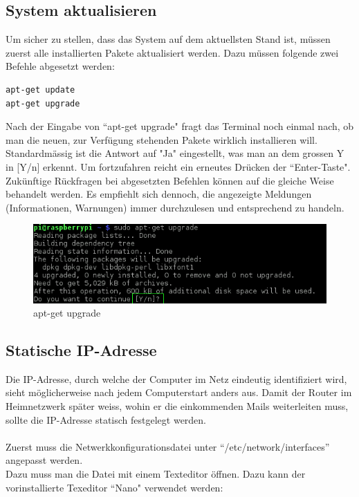 \subsection{System aktualisieren}
Um sicher zu stellen, dass das System auf dem aktuellsten Stand ist, müssen zuerst alle installierten Pakete aktualisiert werden. Dazu müssen folgende zwei Befehle abgesetzt werden:

\begin{lstlisting}
apt-get update
apt-get upgrade
\end{lstlisting}

Nach der Eingabe von ``apt-get upgrade" fragt das Terminal noch einmal nach, ob man die neuen, zur Verfügung stehenden Pakete wirklich installieren will. Standardmässig ist die Antwort auf "Ja" eingestellt, was man an dem grossen Y in [Y/n] erkennt. Um fortzufahren reicht ein erneutes Drücken der ``Enter-Taste". Zukünftige Rückfragen bei abgesetzten Befehlen können auf die gleiche Weise behandelt werden. Es empfiehlt sich dennoch, die angezeigte Meldungen (Informationen, Warnungen) immer durchzulesen und entsprechend zu handeln.

\begin{figure}[h]
\centering
\includegraphics[scale=0.7]{images/upgrade}
\caption{apt-get upgrade}
\end{figure}

\subsection{Statische IP-Adresse}
Die IP-Adresse, durch welche der Computer im Netz eindeutig identifiziert wird, sieht möglicherweise nach jedem Computerstart anders aus. Damit der Router im Heimnetzwerk später weiss, wohin er die einkommenden Mails weiterleiten muss, sollte die IP-Adresse statisch festgelegt werden.
\\
\\
Zuerst muss die Netwerkkonfigurationsdatei unter ``/etc/network/interfaces'' angepasst werden.
\\
Dazu muss man die Datei mit einem Texteditor öffnen. Dazu kann der vorinstallierte Texeditor ``Nano" verwendet werden: 

